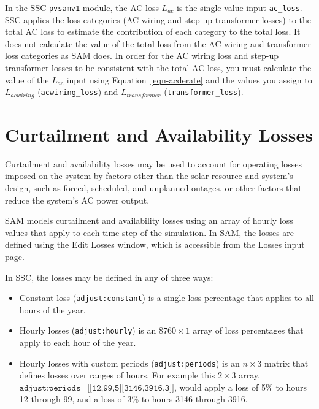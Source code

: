 \documentclass[12pt,letterpaper]{article}
\begin{document}
In the SSC \texttt{pvsamv1} module, the AC loss $L_{ac}$ is the single value input \texttt{ac\_loss}. SSC applies the loss categories (AC wiring and step-up transformer losses) to the total AC loss to estimate the contribution of each category to the total loss. It does not calculate the value of the total loss from the AC wiring and transformer loss categories as SAM does. In order for the AC wiring loss and step-up transformer losses to be consistent with the total AC loss, you must calculate the value of the $L_{ac}$ input using Equation~\ref{eqn-acderate} and the values you assign to $L_{\textit{acwiring}}$ (\texttt{acwiring\_loss}) and $L_{\textit{transformer}}$ (\texttt{transformer\_loss}).

\section{Curtailment and Availability Losses}

Curtailment and availability losses may be used to account for operating losses imposed on the system by factors other than the solar resource and system's design, such as forced, scheduled, and unplanned outages, or other factors that reduce the system's AC power output.

SAM models curtailment and availability losses using an array of hourly loss values that apply to each time step of the simulation. In SAM, the losses are defined using the Edit Losses window, which is accessible from the Losses input page. 

In SSC, the losses may be defined in any of three ways:

\begin{itemize}
\item Constant loss (\texttt{adjust:constant}) is a single loss percentage that applies to all hours of the year.
\item Hourly losses (\texttt{adjust:hourly}) is an $8760\times1$ array of loss percentages that apply to each hour of the year.
\item Hourly losses with custom periods (\texttt{adjust:periods}) is an $n\times3$ matrix that defines losses over ranges of hours. For example this $2\times3$ array, $\texttt{adjust:periods=[[12,99,5][3146,3916,3]]}$, would apply a loss of 5\% to hours 12 through 99, and a loss of 3\% to hours 3146 through 3916.
\end{itemize}
\end{document}
